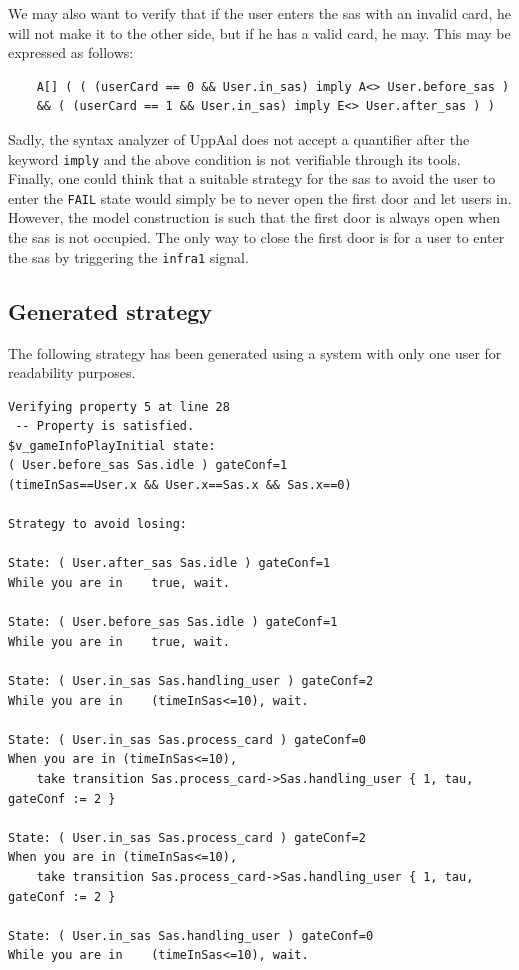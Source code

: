 We may also want to verify that if the user enters the sas with an invalid card, he will not make it to the other side, but if he has a valid card, he may.
This may be expressed as follows:
\begin{small}
\begin{verbatim}
	A[] ( ( (userCard == 0 && User.in_sas) imply A<> User.before_sas ) 
	&& ( (userCard == 1 && User.in_sas) imply E<> User.after_sas ) )
\end{verbatim}
\end{small}

Sadly, the syntax analyzer of UppAal does not accept a quantifier after the keyword \texttt{imply} and the above condition is not verifiable through its tools.\\

Finally, one could think that a suitable strategy for the sas to avoid the user to enter the \texttt{FAIL} state would simply be to never open the first door and let users in.
However, the model construction is such that the first door is always open when the sas is not occupied.
The only way to close the first door is for a user to enter the sas by triggering the \texttt{infra1} signal.

\subsection{Generated strategy}
The following strategy has been generated using a system with only one user for readability purposes.

\begin{verbatim}
Verifying property 5 at line 28
 -- Property is satisfied.
$v_gameInfoPlayInitial state:
( User.before_sas Sas.idle ) gateConf=1 
(timeInSas==User.x && User.x==Sas.x && Sas.x==0)

Strategy to avoid losing:

State: ( User.after_sas Sas.idle ) gateConf=1 
While you are in	true, wait.

State: ( User.before_sas Sas.idle ) gateConf=1 
While you are in	true, wait.

State: ( User.in_sas Sas.handling_user ) gateConf=2 
While you are in	(timeInSas<=10), wait.

State: ( User.in_sas Sas.process_card ) gateConf=0 
When you are in (timeInSas<=10), 
	take transition Sas.process_card->Sas.handling_user { 1, tau, gateConf := 2 }

State: ( User.in_sas Sas.process_card ) gateConf=2 
When you are in (timeInSas<=10), 
	take transition Sas.process_card->Sas.handling_user { 1, tau, gateConf := 2 }

State: ( User.in_sas Sas.handling_user ) gateConf=0 
While you are in	(timeInSas<=10), wait.
\end{verbatim}

